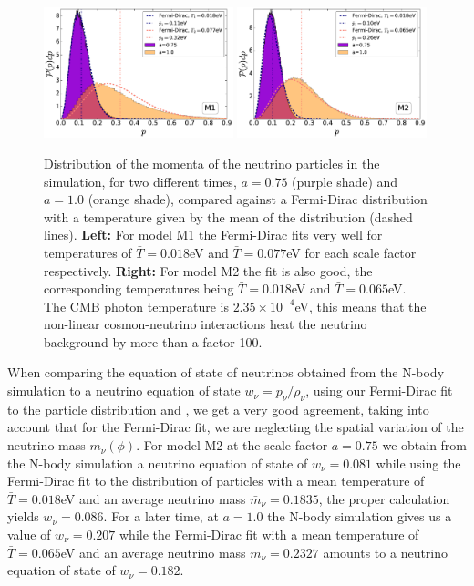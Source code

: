 \begin{figure}
\begin{centering}
\includegraphics[width=0.49\textwidth]{Chapters/gnq/figures/momentum-Histogram-FD-model1-v4}
\includegraphics[width=0.49\textwidth]{Chapters/gnq/figures/momentum-Histogram-FD-model2-v4} 
\par\end{centering}
\caption[Histogram of neutrino momenta from simulations against the Fermi-Dirac distribution.]{\label{fig:histogram-FermiD-1} Distribution of the momenta of the
neutrino particles in the simulation, for two different times, $a=0.75$
(purple shade) and $a=1.0$ (orange shade), compared against a Fermi-Dirac
distribution with a temperature given by the mean of the distribution
(dashed lines). \textbf{Left: }For model M1 the Fermi-Dirac fits very
well for temperatures of $\bar{T}=0.018$eV and $\bar{T}=0.077$eV
for each scale factor respectively. \textbf{Right: }For model M2 the
fit is also good, the corresponding temperatures being $\bar{T}=0.018$eV
and $\bar{T}=0.065$eV. The CMB photon temperature is $2.35\times10^{-4}$eV,
this means that the non-linear cosmon-neutrino interactions heat the
neutrino background by more than a factor 100.}
\end{figure}


When comparing the equation of state of neutrinos obtained from the
N-body simulation to a neutrino equation of state $w_{\nu}=p_{\nu}/\rho_{\nu}$,
using our Fermi-Dirac fit to the particle distribution and , we get a very good agreement, taking
into account that for the Fermi-Dirac fit, we are neglecting the spatial
variation of the neutrino mass $m_{\nu}(\phi)$. For model M2 at the
scale factor $a=0.75$ we obtain from the N-body simulation a neutrino
equation of state of $w_{\nu}=0.081$ while using the Fermi-Dirac
fit to the distribution of particles with a mean temperature of $\bar{T}=0.018$eV
and an average neutrino mass $\bar{m}_{\nu}=0.1835$, the proper calculation
yields $w_{\nu}=0.086$. For a later time, at $a=1.0$ the N-body
simulation gives us a value of $w_{\nu}=0.207$ while the Fermi-Dirac
fit with a mean temperature of $\bar{T}=0.065$eV and an average neutrino
mass $\bar{m}_{\nu}=0.2327$ amounts to a neutrino equation of state
of $w_{\nu}=0.182$.

